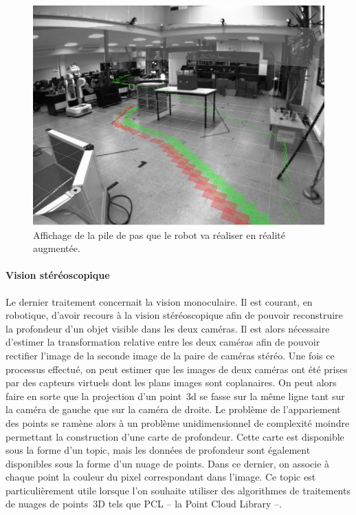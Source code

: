 \begin{figure}
  \begin{center}
    \includegraphics[width=.95\linewidth]{src/chap4-integration/footsteps2.jpg}
  \end{center}
  \caption{Affichage de la pile de pas que le robot va réaliser en
    réalité augmentée.}
\end{figure}



\paragraph{Vision stéréoscopique}


Le dernier traitement concernait la vision monoculaire. Il est
courant, en robotique, d'avoir recours à la vision stéréoscopique afin
de pouvoir reconstruire la profondeur d'un objet visible dans les deux
caméras. Il est alors nécessaire d'estimer la transformation relative
entre les deux caméras afin de pouvoir rectifier l'image de la seconde
image de la paire de caméras stéréo. Une fois ce processus effectué,
on peut estimer que les images de deux caméras ont été prises par des
capteurs virtuels dont les plans images sont coplanaires. On peut
alors faire en sorte que la projection d'un point 3d se fasse sur la
même ligne tant sur la caméra de gauche que sur la caméra de
droite. Le problème de l'appariement des points se ramène alors à un
problème unidimensionnel de complexité moindre permettant la
construction d'une carte de profondeur. Cette carte est disponible
sous la forme d'un topic, mais les données de profondeur sont
également disponibles sous la forme d'un nuage de points. Dans ce
dernier, on associe à chaque point la couleur du pixel correspondant
dans l'image. Ce topic est particulièrement utile lorsque l'on
souhaite utiliser des algorithmes de traitements de nuages de
points 3D tels que PCL -- la Point Cloud Library --.


